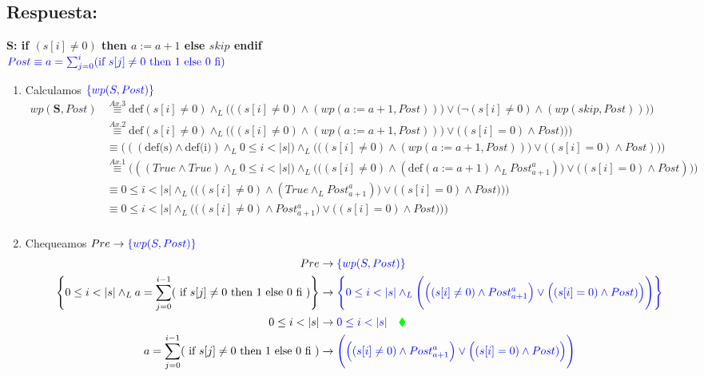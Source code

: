 \documentclass[a4paper]{article}
\begin{document}
\subsection*{Respuesta:}
\textbf{S: if $( s[i]\neq 0)$ then $a := a+1$ else $skip$ endif}\\
\hspace*{24mm}$\color{blue}Post \equiv a=\sum_{j=0}^{i}(\textrm{if }s[j] \neq 0
    \textrm{ then 1 else 0 fi})$\\
\begin{enumerate}

\item Calculamos $\color{blue}\{wp(S,Post)\}$
		\begin{align*}
		wp(\textbf{S},Post)&\stackrel{Ax.3}{\equiv} \textrm{def}(s[i]\neq 0)\wedge_L 
   					\Bigg(\Big((s[i]\neq 0)\wedge (wp(a:=a+1,Post))\Big) 
   					\vee \Big(\neg(s[i]\neq 0)\wedge (wp(skip,Post))\Big)\Bigg)\\
   			&\stackrel{Ax.2}{\equiv}  \textrm{def}(s[i]\neq 0)\wedge_L 
   				\Bigg(\Big((s[i]\neq 0)\wedge (wp(a:=a+1,Post))\Big) 
   				\vee \Big((s[i] = 0)\wedge Post)\Big)\Bigg)\\
   			&\equiv \Big(((\textrm{def(s)}\wedge
				 \textrm{def(i)})\wedge_L 0\leq i<|s|\Big)\wedge_L 
   				\Bigg(\Big((s[i]\neq 0)\wedge (wp(a:=a+1,Post))\Big) 
   				\vee \Big((s[i] = 0)\wedge Post)\Big)\Bigg)\\  
   			&\stackrel{Ax.1}{\equiv} \Big(((True\wedge
				 True)\wedge_L 0\leq i<|s|\Big)\wedge_L 
   				\Bigg(\Big((s[i]\neq 0)\wedge (\textrm{def}(a:=a+1)\wedge_L
   					Post_{a+1}^{a})\Big) \vee \Big((s[i] = 0)\wedge Post)\Big)\Bigg)\\
   			&\equiv  0\leq i<|s|\wedge_L 
   				\Bigg(\Big((s[i]\neq 0)\wedge (True \wedge_L
   					Post_{a+1}^{a})\Big) \vee \Big((s[i] = 0)\wedge Post)\Big)\Bigg)\\
   			&\equiv  0\leq i<|s|\wedge_L 
   				\Bigg(\Big((s[i]\neq 0)\wedge
   					Post_{a+1}^{a}\Big) \vee \Big((s[i] = 0)\wedge Post)\Big)\Bigg)\\ 									
		\end{align*}
\item Chequeamos $Pre \rightarrow \color{blue}\{wp(S,Post)\}$		
		\begin{align*}
		Pre &\rightarrow \color{blue}\{wp(S,Post)\}\\
		\Bigg\{0 \leq i < |s| \wedge_L a=\sum_{j=0}^{i-1}(\textrm{ if }s[j] \neq 0 
    \textrm{ then 1 else 0 fi })\Bigg\} &\rightarrow  \color{blue}\Bigg\{0\leq i<|s|\wedge_L 
   			\Bigg(\Big((s[i]\neq 0)\wedge
   				Post_{a+1}^{a}\Big) \vee \Big((s[i] = 0)\wedge Post)\Big)\Bigg)\Bigg\}\\
   			0 \leq i < |s| &\rightarrow \color{blue} 0\leq i<|s| \quad\color{green}\blacklozenge\\
   			a=\sum_{j=0}^{i-1}(\textrm{ if }s[j] \neq 0 
    \textrm{ then 1 else 0 fi }) &\rightarrow \color{blue} \Bigg(\Big((s[i]\neq 0)\wedge
   				Post_{a+1}^{a}\Big) \vee \Big((s[i] = 0)\wedge Post)\Big)\Bigg)\\
   		\end{align*}


\end{enumerate}
\end{document}
